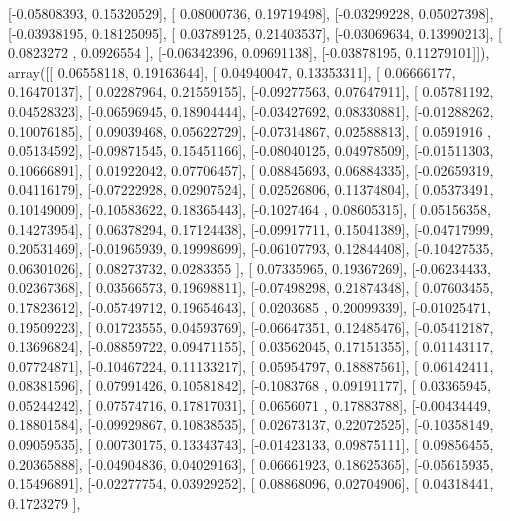 \documentclass{article}
\begin{document}
       [-0.05808393,  0.15320529],
       [ 0.08000736,  0.19719498],
       [-0.03299228,  0.05027398],
       [-0.03938195,  0.18125095],
       [ 0.03789125,  0.21403537],
       [-0.03069634,  0.13990213],
       [ 0.0823272 ,  0.0926554 ],
       [-0.06342396,  0.09691138],
       [-0.03878195,  0.11279101]]), array([[ 0.06558118,  0.19163644],
       [ 0.04940047,  0.13353311],
       [ 0.06666177,  0.16470137],
       [ 0.02287964,  0.21559155],
       [-0.09277563,  0.07647911],
       [ 0.05781192,  0.04528323],
       [-0.06596945,  0.18904444],
       [-0.03427692,  0.08330881],
       [-0.01288262,  0.10076185],
       [ 0.09039468,  0.05622729],
       [-0.07314867,  0.02588813],
       [ 0.0591916 ,  0.05134592],
       [-0.09871545,  0.15451166],
       [-0.08040125,  0.04978509],
       [-0.01511303,  0.10666891],
       [ 0.01922042,  0.07706457],
       [ 0.08845693,  0.06884335],
       [-0.02659319,  0.04116179],
       [-0.07222928,  0.02907524],
       [ 0.02526806,  0.11374804],
       [ 0.05373491,  0.10149009],
       [-0.10583622,  0.18365443],
       [-0.1027464 ,  0.08605315],
       [ 0.05156358,  0.14273954],
       [ 0.06378294,  0.17124438],
       [-0.09917711,  0.15041389],
       [-0.04717999,  0.20531469],
       [-0.01965939,  0.19998699],
       [-0.06107793,  0.12844408],
       [-0.10427535,  0.06301026],
       [ 0.08273732,  0.0283355 ],
       [ 0.07335965,  0.19367269],
       [-0.06234433,  0.02367368],
       [ 0.03566573,  0.19698811],
       [-0.07498298,  0.21874348],
       [ 0.07603455,  0.17823612],
       [-0.05749712,  0.19654643],
       [ 0.0203685 ,  0.20099339],
       [-0.01025471,  0.19509223],
       [ 0.01723555,  0.04593769],
       [-0.06647351,  0.12485476],
       [-0.05412187,  0.13696824],
       [-0.08859722,  0.09471155],
       [ 0.03562045,  0.17151355],
       [ 0.01143117,  0.07724871],
       [-0.10467224,  0.11133217],
       [ 0.05954797,  0.18887561],
       [ 0.06142411,  0.08381596],
       [ 0.07991426,  0.10581842],
       [-0.1083768 ,  0.09191177],
       [ 0.03365945,  0.05244242],
       [ 0.07574716,  0.17817031],
       [ 0.0656071 ,  0.17883788],
       [-0.00434449,  0.18801584],
       [-0.09929867,  0.10838535],
       [ 0.02673137,  0.22072525],
       [-0.10358149,  0.09059535],
       [ 0.00730175,  0.13343743],
       [-0.01423133,  0.09875111],
       [ 0.09856455,  0.20365888],
       [-0.04904836,  0.04029163],
       [ 0.06661923,  0.18625365],
       [-0.05615935,  0.15496891],
       [-0.02277754,  0.03929252],
       [ 0.08868096,  0.02704906],
       [ 0.04318441,  0.1723279 ],
\end{document}
